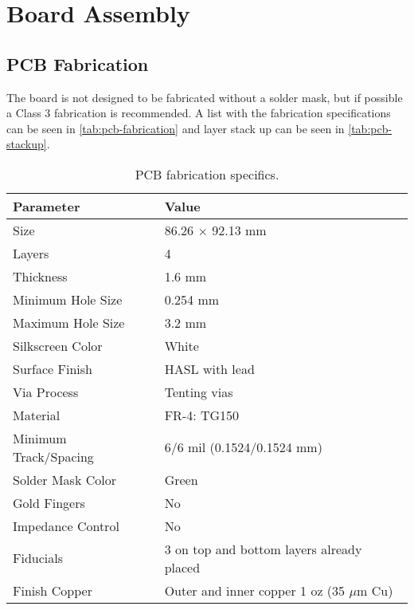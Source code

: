 %
%
%
%
%

%
%
%
%
%
%

\chapter{Board Assembly} \label{ch:assembly}

\section{PCB Fabrication}

The board is not designed to be fabricated without a solder mask, but if possible a Class 3 fabrication is recommended. A list with the fabrication specifications can be seen in \autoref{tab:pcb-fabrication} and layer stack up can be seen in \autoref{tab:pcb-stackup}.

\begin{table}[!h]
    \centering
    \begin{tabular}{L{0.5\columnwidth}L{0.5\columnwidth}}
        \toprule[1.5pt]
        \textbf{Parameter}      & \textbf{Value} \\
        \midrule
        Size                    & 86.26 $\times$ 92.13 mm \\
        Layers                  & 4 \\
        Thickness               & 1.6 mm \\
        Minimum Hole Size       & 0.254 mm \\
        Maximum Hole Size       & 3.2 mm \\
        Silkscreen Color        & White \\
        Surface Finish          & HASL with lead \\
        Via Process             & Tenting vias \\
        Material                & FR-4: TG150 \\
        Minimum Track/Spacing   & 6/6 mil (0.1524/0.1524 mm)\\
        Solder Mask Color       & Green \\
        Gold Fingers            & No \\
        Impedance Control       & No \\   
        Fiducials               & 3 on top and bottom layers already placed \\
        Finish Copper           & Outer and inner copper 1 oz (35 $\mu$m Cu) \\
        \bottomrule[1.5pt]
    \end{tabular}
    \caption{PCB fabrication specifics.}
    \label{tab:pcb-fabrication}
\end{table}


